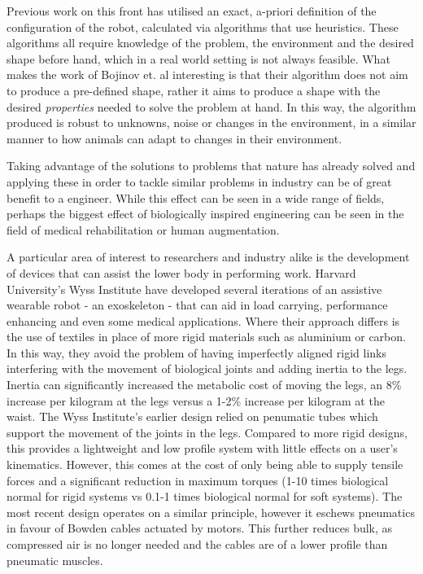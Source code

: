 Previous work on this front has utilised an exact, a-priori definition of the configuration of the robot, calculated via algorithms that use heuristics. \cite{metricsrob} These algorithms all require knowledge of the problem, the environment and the desired shape before hand, which in a real world setting is not always feasible.  What makes the work of Bojinov et. al interesting is that their algorithm does not aim to produce a pre-defined shape, rather it aims to produce a shape with the desired \textsl{properties} needed to solve the problem at hand. In this way, the algorithm produced is robust to unknowns, noise or changes in the environment, in a similar manner to how animals can adapt to changes in their environment. 

Taking advantage of the solutions to problems that nature has already solved and applying these in order to tackle similar problems in industry can be of great benefit to a engineer. While this effect can be seen in a wide range of fields, perhaps the biggest effect of biologically inspired engineering can be seen in the field of medical rehabilitation or human augmentation. 

A particular area of interest to researchers and industry alike is the development of devices that can assist the lower body in performing work. Harvard University's Wyss Institute have developed several iterations of an assistive wearable robot - an exoskeleton - that can aid in load carrying, performance enhancing and even some medical applications. \cite{soft-exo} Where their approach differs is the use of textiles in place of more rigid materials such as aluminium or carbon. In this way, they avoid the problem of having imperfectly aligned rigid links interfering with the movement of biological joints and adding inertia to the legs. Inertia can significantly increased the metabolic cost of moving the legs, an 8\% increase per kilogram at the legs versus a 1-2\% increase per kilogram at the waist. \cite{soft-exo} The Wyss Institute's earlier design relied on penumatic tubes which support the movement of the joints in the legs. Compared to more rigid designs, this provides a lightweight and low profile system with little effects on a user's kinematics. However, this comes at the cost of only being able to supply tensile forces and a significant reduction in maximum torques (1-10 times biological normal for rigid systems vs 0.1-1 times biological normal for soft systems). The most recent design operates on a similar principle, however it eschews pneumatics in favour of Bowden cables actuated by motors. This further reduces bulk, as compressed air is no longer needed and the cables are of a lower profile than pneumatic muscles.

